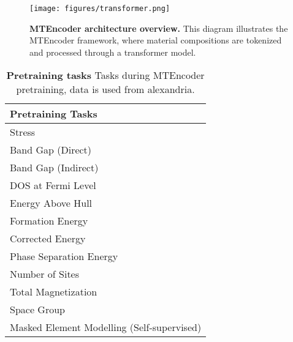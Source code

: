 
\begin{figure}[htb!]
    \centering
        \centering
        \texttt{[image: figures/transformer.png]}
        \caption{\textbf{MTEncoder architecture overview.}
        This diagram illustrates the MTEncoder framework, where material compositions are tokenized and processed through a transformer model.}
        \label{fig:plotmte}
\end{figure}

\begin{table}[h]
    \centering
    \begin{tabular}{l}
        \toprule
        \textbf{Pretraining Tasks} \\
        \midrule
        Stress \\
        Band Gap (Direct) \\
        Band Gap (Indirect) \\
        DOS at Fermi Level \\
        Energy Above Hull \\
        Formation Energy \\
        Corrected Energy \\
        Phase Separation Energy \\
        Number of Sites \\
        Total Magnetization \\
        Space Group \\
        Masked Element Modelling (Self-supervised) \\
        \bottomrule
    \end{tabular}
    \caption{\textbf{Pretraining tasks}
    Tasks during MTEncoder pretraining, data is used from alexandria.}
    \label{tab:pretraining_tasks}
\end{table}


